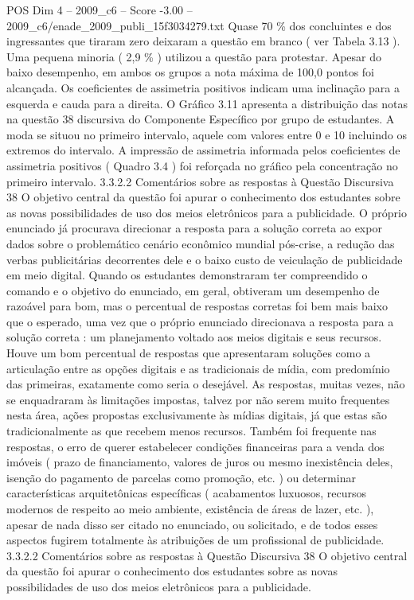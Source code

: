 \begin{textsample}{POS Dim 4 – 2009\_c6 – Score -3.00 – 2009\_c6/enade\_2009\_publi\_15f3034279.txt}
Quase 70 \% dos concluintes e dos ingressantes que tiraram zero deixaram a questão em branco ( ver Tabela 3.13 ).
Uma pequena minoria ( 2,9 \% ) utilizou a questão para protestar.
Apesar do baixo desempenho, em ambos os grupos a nota máxima de 100,0 pontos foi alcançada.
Os coeficientes de assimetria positivos indicam uma inclinação para a esquerda e cauda para a direita.
O Gráfico 3.11 apresenta a distribuição das notas na questão 38 discursiva do Componente Específico por grupo de estudantes.
A moda se situou no primeiro intervalo, aquele com valores entre 0 e 10 incluindo os extremos do intervalo.
A impressão de assimetria informada pelos coeficientes de assimetria positivos ( Quadro 3.4 ) foi reforçada no gráfico pela concentração no primeiro intervalo. 3.3.2.2 Comentários sobre as respostas à Questão Discursiva 38 O objetivo central da questão foi apurar o conhecimento dos estudantes sobre as novas possibilidades de uso dos meios eletrônicos para a publicidade.
O próprio enunciado já procurava direcionar a resposta para a solução correta ao expor dados sobre o problemático cenário econômico mundial pós-crise, a redução das verbas publicitárias decorrentes dele e o baixo custo de veiculação de publicidade em meio digital.
Quando os estudantes demonstraram ter compreendido o comando e o objetivo do enunciado, em geral, obtiveram um desempenho de razoável para bom, mas o percentual de respostas corretas foi bem mais baixo que o esperado, uma vez que o próprio enunciado direcionava a resposta para a solução correta : um planejamento voltado aos meios digitais e seus recursos.
Houve um bom percentual de respostas que apresentaram soluções como a articulação entre as opções digitais e as tradicionais de mídia, com predomínio das primeiras, exatamente como seria o desejável.
As respostas, muitas vezes, não se enquadraram às limitações impostas, talvez por não serem muito frequentes nesta área, ações propostas exclusivamente às mídias digitais, já que estas são tradicionalmente as que recebem menos recursos.
Também foi frequente nas respostas, o erro de querer estabelecer condições financeiras para a venda dos imóveis ( prazo de financiamento, valores de juros ou mesmo inexistência deles, isenção do pagamento de parcelas como promoção, etc. ) ou determinar características arquitetônicas específicas ( acabamentos luxuosos, recursos modernos de respeito ao meio ambiente, existência de áreas de lazer, etc. ), apesar de nada disso ser citado no enunciado, ou solicitado, e de todos esses aspectos fugirem totalmente às atribuições de um profissional de publicidade. 3.3.2.2 Comentários sobre as respostas à Questão Discursiva 38 O objetivo central da questão foi apurar o conhecimento dos estudantes sobre as novas possibilidades de uso dos meios eletrônicos para a publicidade.

\end{textsample}
